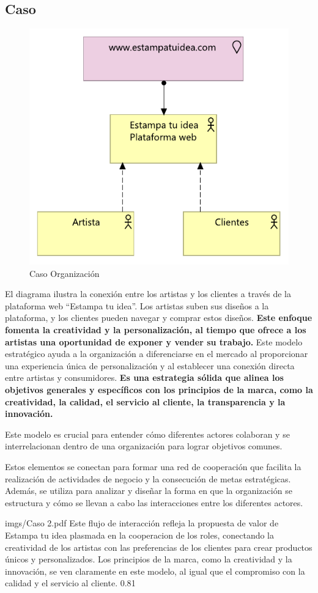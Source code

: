 \subsection{Caso}
\begin{figure}[H]
	\centering	
    \includegraphics[width=0.55\linewidth]{imgs/Caso 1.pdf}
	\caption{Caso Organización}	
 \end{figure}

     El diagrama ilustra la conexión entre los artistas y los clientes a través de la plataforma web “Estampa tu idea”. Los artistas suben sus diseños a la plataforma, y los clientes pueden navegar y comprar estos diseños.\textbf{ Este enfoque fomenta la creatividad y la personalización, al tiempo que ofrece a los artistas una oportunidad de exponer y vender su trabajo.} Este modelo estratégico ayuda a la organización a diferenciarse en el mercado al proporcionar una experiencia única de personalización y al establecer una conexión directa entre artistas y consumidores. \textbf{Es una estrategia sólida que alinea los objetivos generales y específicos con los principios de la marca, como la creatividad, la calidad, el servicio al cliente, la transparencia y la innovación.}

{
   Este modelo es crucial para entender cómo diferentes actores colaboran y se interrelacionan dentro de una organización para lograr objetivos comunes.
   
   Estos elementos se conectan para formar una red de cooperación que facilita la realización de actividades de negocio y la consecución de metas estratégicas. Además, se utiliza para analizar y diseñar la forma en que la organización se estructura y cómo se llevan a cabo las interacciones entre los diferentes actores.
}
{imgs/Caso 2.pdf}
{
    Este flujo de interacción refleja la propuesta de valor de Estampa tu idea plasmada en la cooperacion de los roles, conectando la creatividad de los artistas con las preferencias de los clientes para crear productos únicos y personalizados. Los principios de la marca, como la creatividad y la innovación, se ven claramente en este modelo, al igual que el compromiso con la calidad y el servicio al cliente.
}{0.8}{1}

